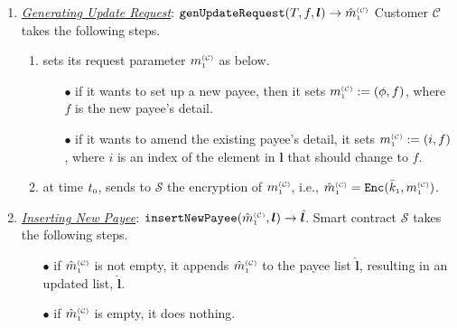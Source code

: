 \begin{enumerate}[leftmargin=.46cm]
\item\label{genUpdateRequest}  {\underline{\textit{Generating  Update Request}}: $\mathtt{genUpdateRequest}(T, f, {\bm l})\rightarrow \hat m^{\scriptscriptstyle\mathcal{(C)}}_{\scriptscriptstyle 1}$}
%
Customer $\mathcal{C}$ takes the following steps. 

\begin{enumerate}
%
\item sets its request parameter $m_{\scriptscriptstyle 1}^{\scriptscriptstyle(\mathcal C)}$ as below. 
%
\begin{itemize}

\item[$\bullet$] if it wants to set up a new payee, then it sets $m_{\scriptscriptstyle 1}^{\scriptscriptstyle(\mathcal C)}:=(\phi,f)$, where $f$ is the new payee's detail.  %

%
\item[$\bullet$] if it wants to amend the existing payee's detail,   it sets $m_{\scriptscriptstyle 1}^{\scriptscriptstyle(\mathcal C)}:=(i, f)$, where $i$ is an index of the element in $\bm l$ that should  change to $f$.  %



\end{itemize}
\item\label{send-update-req} at time $t_{\scriptscriptstyle 0}$, sends to $\mathcal{S}$  the encryption of $m_{\scriptscriptstyle 1}^{\scriptscriptstyle(\mathcal C)}$, i.e., $\hat m_{\scriptscriptstyle 1}^{\scriptscriptstyle(\mathcal C)}=\mathtt{Enc}(\bar k_{\scriptscriptstyle 1}, m_{\scriptscriptstyle 1}^{\scriptscriptstyle(\mathcal C)})$. 
\end{enumerate}
%

 \item \underline{\textit{Inserting New Payee}}: $\mathtt{insertNewPayee}(\hat m^{\scriptscriptstyle\mathcal{(C)}}_{\scriptscriptstyle 1}, {\bm l})\rightarrow {\hat{\bm l}}$.
Smart contract $\mathcal{S}$ takes the following steps. 
 \begin{itemize}
 \item[$\bullet$] if $\hat m_{\scriptscriptstyle 1}^{\scriptscriptstyle(\mathcal C)}$  is not empty, it appends $\hat m_{\scriptscriptstyle 1}^{\scriptscriptstyle(\mathcal C)}$ to the payee list $\hat{\bm l}$, resulting in an updated list, $\hat{\bm l}$. 
  \item[$\bullet$] if $\hat m_{\scriptscriptstyle 1}^{\scriptscriptstyle(\mathcal C)}$ is empty,  it does nothing. 
 \end{itemize}
 

\end{enumerate}
